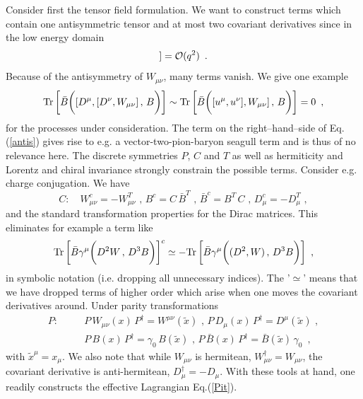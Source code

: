 Consider first the tensor
field formulation. We want to construct terms which contain one
antisymmetric tensor and at most two covariant derivatives since in the
low energy domain
\begin{equation}
[D_\mu , [D_\nu , W_{\lambda \kappa}]] = {\cal O}(q^2) \, \, \, .
\end{equation}
Because of the antisymmetry of $W_{\mu \nu}$, many terms vanish. We
give one example
\begin{equation}
{\rm Tr} \, \biggl[ \bar{B} \biggl( [D^\mu , [D^\nu , W_{\mu \nu}] \, ,
\, B \biggr) \biggr] \sim {\rm Tr} \, \biggl[ \bar{B} \biggl( [u^\mu,
u^\nu] , W_{\mu \nu}] \, , \, B \biggr) \biggr] = 0 \, \, \, ,
\label{antis}
\end{equation}
for the processes under consideration. The term on the
right--hand--side of Eq.(\ref{antis}) gives rise to e.g. a
vector-two-pion-baryon seagull term and is thus of no relevance here.
The discrete symmetries $P$, $C$ and $T$ as well as hermiticity and
Lorentz and chiral invariance strongly constrain the possible terms.
Consider e.g. charge conjugation. We have
\begin{equation}
C: \quad W_{\mu \nu}^c = -W_{\mu \nu}^T \, \, , \,
B^c = C \, \bar{B}^T \, \, , \, \bar{B}^c = B^T \, C \, \, , \,
D_\mu^c = -D_\mu^T \, \, ,
\label{chargec}
\end{equation}
and the standard  transformation properties for the Dirac matrices.
This eliminates for example a term like
\begin{equation}
{\rm Tr} \, \biggl[ \bar{B} \gamma^\mu \biggl( D^2 W \, ,
\, D^3B \biggr) \biggr]^c \simeq -{\rm Tr} \, \biggl[ \bar{B}
\gamma^\mu \biggl(
(D^2 , W) \, , \, D^3 B \biggr) \biggr]  \, \, \, ,
\end{equation}
in symbolic notation (i.e. dropping all unnecessary indices).
The '$\simeq$' means that we have dropped terms of higher order which
arise when one moves the covariant derivatives around. Under parity
transformations
\begin{eqnarray}
P: & &\quad P \,W_{\mu \nu}(x) \, P^\dagger
= W^{\mu \nu}(\tilde{x}) \, \, , \,
P \, D_\mu (x) \, P^\dagger = D^\mu (\tilde{x}) \, \, , \nonumber \\
& & \quad P \, B(x) \,P^\dagger = \gamma_0 \, B (\tilde{x}) \, \, , \,
P \, \bar{B}(x) \,P^\dagger =  \bar{B} (\tilde{x}) \, \gamma_0 \,\, \, ,
\label{parity}
\end{eqnarray}
with $\tilde{x}^\mu = x_\mu$. We also note that while $W_{\mu \nu}$ is
hermitean, $W_{\mu \nu}^\dagger = W_{\mu \nu}$, the covariant
derivative is anti-hermitean, $D_\mu^\dagger = - D_\mu$. With these
tools at hand, one readily constructs the effective Lagrangian
Eq.(\ref{Pit}).

